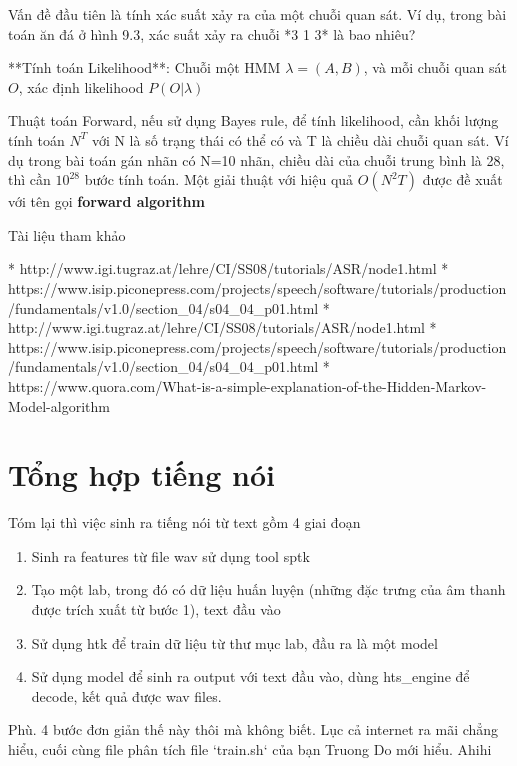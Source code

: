 Vấn đề đầu tiên là tính xác suất xảy ra của một chuỗi quan sát. Ví dụ, trong bài toán ăn đá ở hình 9.3, xác suất xảy ra chuỗi *3 1 3* là bao nhiêu?

**Tính toán Likelihood**: Chuỗi một HMM $\lambda = (A, B)$, và mỗi chuỗi quan sát $O$, xác định likelihood $P(O|\lambda)$

Thuật toán Forward, nếu sử dụng Bayes rule, để tính likelihood, cần khối lượng tính toán $N^T$ với N là số trạng thái có thể có và T là chiều dài chuỗi quan sát. Ví dụ trong bài toán gán nhãn có N=10 nhãn, chiều dài của chuỗi trung bình là 28, thì cần $10^{28}$ bước tính toán. Một giải thuật với hiệu quả $O(N^2T)$ được đề xuất với tên gọi \textbf{forward algorithm}

Tài liệu tham khảo

* http://www.igi.tugraz.at/lehre/CI/SS08/tutorials/ASR/node1.html
* https://www.isip.piconepress.com/projects/speech/software/tutorials/production/fundamentals/v1.0/section_04/s04_04_p01.html
* http://www.igi.tugraz.at/lehre/CI/SS08/tutorials/ASR/node1.html
* https://www.isip.piconepress.com/projects/speech/software/tutorials/production/fundamentals/v1.0/section_04/s04_04_p01.html
* https://www.quora.com/What-is-a-simple-explanation-of-the-Hidden-Markov-Model-algorithm

\chapter{Tổng hợp tiếng nói}


Tóm lại thì việc sinh ra tiếng nói từ text gồm 4 giai đoạn

\begin{enumerate}
  \item Sinh ra features từ file wav sử dụng tool sptk
  \item Tạo một lab, trong đó có dữ liệu huấn luyện (những đặc trưng của âm thanh được trích xuất từ bước 1), text đầu vào
  \item Sử dụng htk để train dữ liệu từ thư mục lab, đầu ra là một model
  \item Sử dụng model để sinh ra output với text đầu vào, dùng hts\_engine để decode, kết quả được wav files.
\end{enumerate}

Phù. 4 bước đơn giản thế này thôi mà không biết. Lục cả internet ra mãi chẳng hiểu, cuối cùng file phân tích file `train.sh` của bạn Truong Do mới hiểu. Ahihi